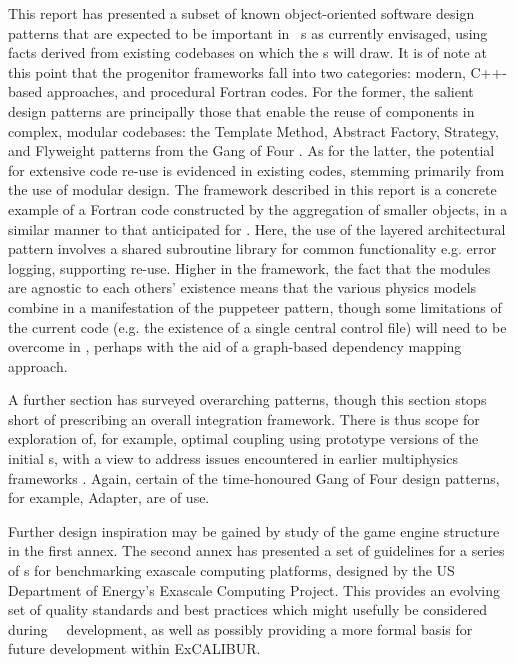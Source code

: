 This report has presented a subset of known object-oriented software design
patterns that are expected to be important in \nep\ \papp s as currently
envisaged, using facts derived from existing codebases on which the
\papp s will draw.  
It is of note at this point that the progenitor frameworks fall into two
categories: modern, C++-based approaches,
and procedural Fortran codes.  
For the former, the salient design patterns are principally those that enable
the reuse of components in complex, modular codebases: the Template Method,
Abstract Factory, Strategy, and Flyweight patterns from the Gang of Four
\cite{gammahelmjohnsonvlissides}.
As for the latter, the potential for extensive code re-use is evidenced in 
existing codes, stemming primarily from the use of modular design.
The  framework described in this report is a concrete example of 
a Fortran code constructed by the aggregation of smaller objects, 
in a similar manner to that anticipated for \nep.
Here, the use of the layered architectural pattern involves a shared subroutine library
for common functionality e.g. error logging, supporting re-use.  
Higher in the framework, the fact that the modules are agnostic to each others' 
existence means that the various physics models combine in a manifestation of 
the puppeteer pattern, though some limitations of the current code 
(e.g. the existence of a single central control file) will need to be overcome 
in \nep, perhaps with the aid of a graph-based dependency mapping approach. 

A further section has surveyed overarching patterns, though this
section stops short of prescribing an overall integration framework.  
There is thus scope for exploration of, for example, optimal coupling using
prototype versions of the initial \papp s, with a view to address issues
encountered in earlier multiphysics frameworks \cite{y2re332, compatwebsite,
vecmawebsite}.
Again, certain of the time-honoured Gang of Four design patterns, for example,
Adapter, are of use.

Further design inspiration may be gained by study of the game
engine structure in the first annex.
The second  annex has presented a set of guidelines for a series of \papp s for
benchmarking exascale computing platforms, designed by the US Department of
Energy's Exascale Computing Project.  
This provides an evolving set of quality standards and best practices which
might usefully be considered during \nep\ \papp\ development, as well as
possibly providing a more formal basis for future development within ExCALIBUR.
